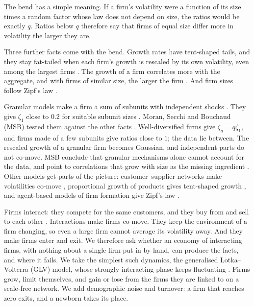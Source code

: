 \documentclass[pre,twocolumn,superscriptaddress,nofootinbib]{revtex4-2}
\begin{document}
The bend has a simple meaning.  If a firm's volatility were a function of its size times a random factor
whose law does not depend on size, the ratios would be exactly $q$.  Ratios below $q$ therefore say that firms
of equal size differ more in volatility the larger they are.

Three further facts come with the bend.  Growth rates have tent-shaped tails, and they stay fat-tailed when
each firm's growth is rescaled by its own volatility, even among the largest firms \cite{moran2024}.  The
growth of a firm correlates more with the aggregate, and with firms of similar size, the larger the firm
\cite{moran2024}.  And firm sizes follow Zipf's law \cite{axtell2001}.

Granular models make a firm a sum of subunits with independent shocks \cite{wyartbouchaud2003,gabaix2011}.
They give $\zeta_1$ close to $0.2$ for suitable subunit sizes \cite{sutton2002}.  Moran, Secchi and Bouchaud
(MSB) tested them against the other facts \cite{moran2024}.  Well-diversified firms give $\zeta_q=q\zeta_1$,
and firms made of a few subunits give ratios close to $1$; the data lie between.  The rescaled growth of a
granular firm becomes Gaussian, and independent parts do not co-move.  MSB conclude that granular mechanisms
alone cannot account for the data, and point to correlations that grow with size as the missing ingredient
\cite{moran2024,herskovic2020}.  Other models get parts of the picture: customer--supplier networks make
volatilities co-move \cite{herskovic2020}, proportional growth of products gives tent-shaped growth
\cite{fu2005}, and agent-based models of firm formation give Zipf's law \cite{axtell2016}.

Firms interact: they compete for the same customers, and they buy from and sell to each other
\cite{acemoglu2012,carvalho2019}.  Interactions make firms co-move.  They keep the environment of a firm
changing, so even a large firm cannot average its volatility away.  And they make firms enter and exit.  We
therefore ask whether an economy of interacting firms, with nothing about a single firm put in by hand, can
produce the facts, and where it fails.  We take the simplest such dynamics, the generalised Lotka--Volterra (GLV)
model, whose strongly interacting phase keeps fluctuating \cite{roy2020,mallmin2024,arnouxbunin2024}.  Firms grow,
limit themselves, and gain or lose from the firms they are linked to on a scale-free network.  We add demographic
noise and turnover: a firm that reaches zero exits, and a newborn takes its place.
\end{document}
